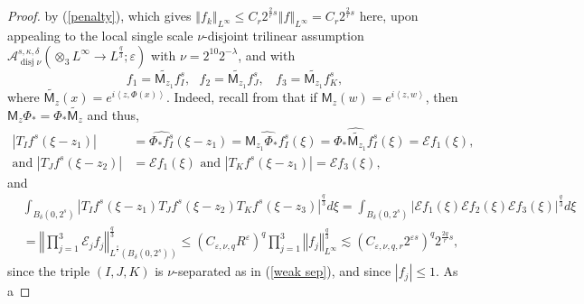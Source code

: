 \documentclass{amsart}%
\theoremstyle{plain}
\numberwithin{equation}{section}
\begin{document}
\begin{proof}
by (\ref{penalty}), which gives $\left\Vert f_{k}\right\Vert _{L^{\infty}}\leq
C_{r}2^{\frac{2}{r}s}\left\Vert f\right\Vert _{L^{\infty}}=C_{r}2^{\frac{2}%
{r}s}$ here, upon appealing to the local single scale $\nu$-disjoint trilinear
assumption $\mathcal{A}_{\operatorname*{disj}\nu}^{s,\kappa,\delta}\left(
\otimes_{3}L^{\infty}\rightarrow L^{\frac{q}{3}};\varepsilon\right)  $ with
$\nu=2^{10}2^{-\lambda}$, and with%
\[
f_{1}=\widetilde{\mathsf{M}_{z_{1}}}f_{I}^{s},\ \ \ f_{2}=\widetilde
{\mathsf{M}_{z_{1}}}f_{J}^{s},\ \ \ \ f_{3}=\widetilde{\mathsf{M}_{z_{1}}%
}f_{K}^{s},
\]
where $\widetilde{\mathsf{M}_{z}}\left(  x\right)  =e^{i\left\langle
z,\Phi\left(  x\right)  \right\rangle }$. Indeed, recall from \cite{RiSa} that
if $\mathsf{M}_{z}\left(  w\right)  =e^{i\left\langle z,w\right\rangle }$,
then $\mathsf{M}_{z}\Phi_{\ast}=\Phi_{\ast}\widetilde{\mathsf{M}_{z}}$ and
thus,%
\begin{align*}
\left\vert T_{I}f^{s}\left(  \xi-z_{1}\right)  \right\vert  &  =\widehat
{\Phi_{\ast}f_{I}^{s}}\left(  \xi-z_{1}\right)  =\widehat{\mathsf{M}_{z_{1}%
}\Phi_{\ast}f_{I}^{s}}\left(  \xi\right)  =\widehat{\Phi_{\ast}\widetilde
{\mathsf{M}_{z_{1}}}f_{I}^{s}}\left(  \xi\right)  =\mathcal{E}f_{1}\left(
\xi\right)  ,\\
\text{and }\left\vert T_{J}f^{s}\left(  \xi-z_{2}\right)  \right\vert  &
=\mathcal{E}f_{1}\left(  \xi\right)  \text{ and }\left\vert T_{K}f^{s}\left(
\xi-z_{1}\right)  \right\vert =\mathcal{E}f_{3}\left(  \xi\right)  \text{,}%
\end{align*}
and%
\begin{align*}
&  \int_{B_{\delta}\left(  0,2^{s}\right)  }\left\vert T_{I}f^{s}\left(
\xi-z_{1}\right)  T_{J}f^{s}\left(  \xi-z_{2}\right)  T_{K}f^{s}\left(
\xi-z_{3}\right)  \right\vert ^{\frac{q}{3}}d\xi=\int_{B_{\delta}\left(
0,2^{s}\right)  }\left\vert \mathcal{E}f_{1}\left(  \xi\right)  \mathcal{E}%
f_{2}\left(  \xi\right)  \mathcal{E}f_{3}\left(  \xi\right)  \right\vert
^{\frac{q}{3}}d\xi\\
&  =\left\Vert \prod_{j=1}^{3}\mathcal{E}_{j}f_{j}\right\Vert _{L^{^{\frac
{q}{3}}}\left(  B_{\delta}\left(  0,2^{s}\right)  \right)  }^{\frac{q}{3}}%
\leq\left(  C_{\varepsilon,\nu,q}R^{\varepsilon}\right)  ^{q}\prod_{j=1}%
^{3}\left\Vert f_{j}\right\Vert _{L^{\infty}}^{\frac{q}{3}}\lesssim\left(
C_{\varepsilon,\nu,q,r}2^{\varepsilon s}\right)  ^{q}2^{\frac{2q}{r}s},
\end{align*}
since the triple $\left(  I,J,K\right)  $ is $\nu$-separated as in
(\ref{weak sep}), and since $\left\vert f_{j}\right\vert \leq1$. As a

\end{proof}
\end{document}
